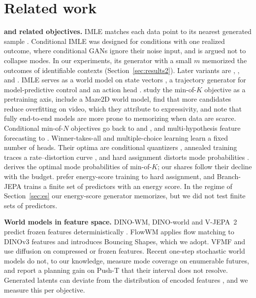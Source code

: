 \section{Related work}
\label{sec:related}
\textbf{\Nom{} and related objectives.} IMLE matches each data point to its nearest generated sample \citep{li2018imle}. Conditional IMLE \citep{li2019diverse,li2020multimodal} was designed for conditions with one realized outcome, where conditional GANs ignore their noise input, and is argued not to collapse modes. In our experiments, its generator with a small $m$ memorized the outcomes of identifiable contexts (Section~\ref{sec:results2}). Later variants are \citet{vashist2024rsimle}, \citet{aghabozorgi2023adaptive}, \citet{peng2022chimle} and \citet{vashist2026roms}. IMLE serves as a world model on state vectors \citep{aghabozorgi2026wimle}, a trajectory generator for model-predictive control \citep{lee2026imlempc} and an action head \citep{rana2025imlepolicy,hosseinkhani2026imlevla}. \citet{gladstone2026xm} study the min-of-$K$ objective as a pretraining axis, include a Maze2D world model, find that more candidates reduce overfitting on video, which they attribute to expressivity, and note that fully end-to-end models are more prone to memorizing when data are scarce. Conditional min-of-$N$ objectives go back to \citet{fan2017pointset} and \citet{bhattacharyya2018bestofmany}, and multi-hypothesis feature forecasting to \citet{vondrick2016anticipating}. Winner-takes-all and multiple-choice learning \citep{guzman2012mcl,lee2016smcl,rupprecht2017mhp,makansi2019ewta,seo2020tmcl} learn a fixed number of heads. Their optima are conditional quantizers \citep{letzelter2024wta,delattre2025cdq,cortes2025timemcl}, annealed training traces a rate--distortion curve \citep{perera2024amcl}, and hard assignment distorts mode probabilities \citep{wu2026wtagmm}. \citet{bennett2026freedom} derives the optimal mode probabilities of min-of-$K$; our shares follow their decline with the budget. \citet{makabe2026esp} prefer energy-score training to hard assignment, and Branch-JEPA \citep{song2026branchjepa} trains a finite set of predictors with an energy score. In the regime of Section~\ref{sec:es} our energy-score generator memorizes, but we did not test finite sets of predictors.

\textbf{World models in feature space.} DINO-WM, DINO-world and V-JEPA~2 predict frozen features deterministically \citep{zhou2025dinowm,baldassarre2025dinoworld,assran2025vjepa2}. FlowWM \citep{porcher2026flowwm} applies flow matching to DINOv3 features and introduces Bouncing Shapes, which we adopt. VFMF \citep{boduljak2025vfmf} and \citet{walker2025generalist} use diffusion on compressed or frozen features. Recent one-step stochastic world models \citep{lu2026driftworld,agibot2026geact,lee2026beckmann,park2026priming,hsu2026vsf} do not, to our knowledge, measure mode coverage on enumerable futures, and \citet{lee2026beckmann} report a planning gain on Push-T that their interval does not resolve. Generated latents can deviate from the distribution of encoded features \citep{zheng2025rae,boduljak2025vfmf,karypidis2026latentforesight}, and we measure this per objective.

